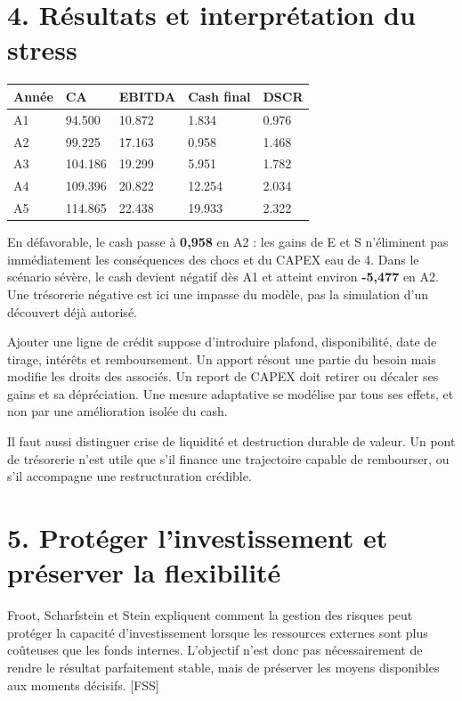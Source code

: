 \documentclass[12pt,a4paper]{article}
\begin{document}
\section*{4. Résultats et interprétation du stress}

\Needspace{250pt}
\begin{longtable}{p{2.84cm}p{2.84cm}p{2.84cm}p{2.84cm}p{2.84cm}}
\toprule
Année & CA & EBITDA & Cash final & DSCR \\
\midrule\endhead
A1 & 94.500 & 10.872 & 1.834 & 0.976 \\
A2 & 99.225 & 17.163 & 0.958 & 1.468 \\
A3 & 104.186 & 19.299 & 5.951 & 1.782 \\
A4 & 109.396 & 20.822 & 12.254 & 2.034 \\
A5 & 114.865 & 22.438 & 19.933 & 2.322 \\
\bottomrule
\end{longtable}

En défavorable, le cash passe à \textbf{0,958} en A2 : les gains de E et S n’éliminent pas immédiatement les conséquences des chocs et du CAPEX eau de 4. Dans le scénario sévère, le cash devient négatif dès A1 et atteint environ \textbf{-5,477} en A2. Une trésorerie négative est ici une impasse du modèle, pas la simulation d’un découvert déjà autorisé.


Ajouter une ligne de crédit suppose d’introduire plafond, disponibilité, date de tirage, intérêts et remboursement. Un apport résout une partie du besoin mais modifie les droits des associés. Un report de CAPEX doit retirer ou décaler ses gains et sa dépréciation. Une mesure adaptative se modélise par tous ses effets, et non par une amélioration isolée du cash.


Il faut aussi distinguer crise de liquidité et destruction durable de valeur. Un pont de trésorerie n’est utile que s’il finance une trajectoire capable de rembourser, ou s’il accompagne une restructuration crédible.

\section*{5. Protéger l’investissement et préserver la flexibilité}
Froot, Scharfstein et Stein expliquent comment la gestion des risques peut protéger la capacité d’investissement lorsque les ressources externes sont plus coûteuses que les fonds internes. L’objectif n’est donc pas nécessairement de rendre le résultat parfaitement stable, mais de préserver les moyens disponibles aux moments décisifs. [FSS]
\end{document}
